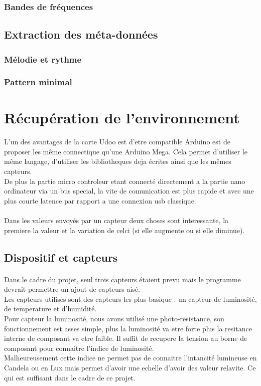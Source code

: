 \documentclass[a4paper, titlepage, oneside, 12pt]{article}%
\begin{document}
\subsubsection{Bandes de fréquences}

\subsection{Extraction des méta-données}
\subsubsection{Mélodie et rythme}
\subsubsection{Pattern minimal}

\newpage
\section{Récupération de l'environnement}
\paragraph{}
L'un des avantages de la carte Udoo est d'etre compatible Arduino est de proposer les même connectique qu'une Arduino Mega. Cela permet d'utiliser le même langage, d'utiliser les bibliotheques deja écrites ainsi que les mêmes capteurs.\\
De plus la partie  micro controleur etant connecté directement a la partie nano ordinateur via un bus special, la vite de comunication est plus rapide et avec une plus courte latence par rapport a une connexion usb classique.

\paragraph{}
Dans les valeurs envoyés par un capteur deux choses sont interessante, la premiere la valeur et la variation de celci (si elle augmente ou si elle diminue).
\subsection{Dispositif et capteurs}
\paragraph{}
Dans le cadre du projet, seul trois capteurs étaient prevu mais le programme devrait permettre un ajout de capteurs  aisé.\\
Les capteurs utilisés sont des capteurs les plus basique : un capteur de luminosité, de temperature et d'humidité.\\
Pour capteur la luminosité, nous avons utilisé une photo-resistance, son fonctionnement est asses simple, plus la luminosité va etre forte plus la resitance interne de composant va etre faible. Il suffit de recupere la tension au borne de composant pour connaitre l'indice de luminosité.\\ 
Malheureusement cette indice ne permet pas de connaitre l'intancité lumineuse en Candela ou en Lux mais permet d'avoir une echelle d'avoir des valeur relavite. Ce qui est suffisant dans le cadre de ce projet.
\end{document}
